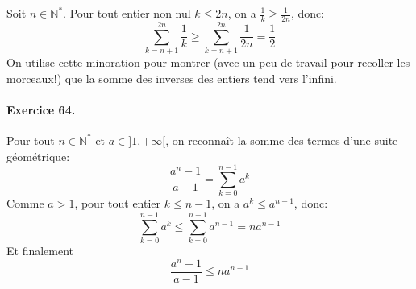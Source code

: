 Soit $n\in\mathbb{N}^*$. Pour tout entier non nul $k\leq 2n$, on a $\frac{1}{k}\geq \frac{1}{2n}$, donc:
\[
\sum_{k=n+1}^{2n}{\frac{1}{k}}\geq \sum_{k=n+1}^{2n}{\frac{1}{2n}}=\frac{1}{2}
\]
On utilise cette minoration pour montrer (avec un peu de travail pour recoller les morceaux!) que la somme des inverses des entiers tend vers l'infini.
\paragraph{Exercice 64.} Pour tout $n\in\mathbb{N}^*$ et $a\in]1,+\infty[$, on reconnaît la somme des termes d'une suite géométrique:
\[
\frac{a^n-1}{a-1} = \sum_{k=0}^{n-1}{a^k}
\]
Comme $a>1$, pour tout entier $k\leq n-1$, on a $a^k\leq a^{n-1}$, donc:
\[
\sum_{k=0}^{n-1}{a^k} \leq \sum_{k=0}^{n-1}{a^{n-1}} = na^{n-1}
\] 
Et finalement
\[
\frac{a^n-1}{a-1}  \leq na^{n-1}
\] 
